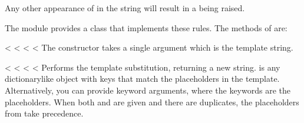 \documentclass[letterpaper,10pt,english]{sphinxmanual}
\begin{document}
Any other appearance of \sphinxcode{\sphinxupquote{\$}} in the string will result in a 
being raised.

The {\hyperref[\detokenize{string:module-string}]{}} module provides a {\hyperref[\detokenize{string:string.Template}]{}} class that implements
these rules.  The methods of {\hyperref[\detokenize{string:string.Template}]{}} are:

\vspace{5px}

\begin{fulllineitems}
\label{\detokenize{string:string.Template}}
<%
\pysigstartsignatures
<%
<%
<%
The constructor takes a single argument which is the template string.

\vspace{5px}

\begin{fulllineitems}
\label{\detokenize{string:string.Template.substitute}}
<%
\pysigstartsignatures
<%
<%
<%
Performs the template substitution, returning a new string.   is
any dictionary\sphinxhyphen{}like object with keys that match the placeholders in the
template.  Alternatively, you can provide keyword arguments, where the
keywords are the placeholders.  When both  and  are given
and there are duplicates, the placeholders from  take precedence.


\end{fulllineitems}
\end{fulllineitems}
\end{document}
